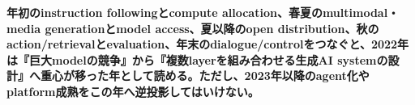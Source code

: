 \noindent\textbf{年初のinstruction followingとcompute allocation、春夏のmultimodal・media generationとmodel access、夏以降のopen distribution、秋のaction/retrievalとevaluation、年末のdialogue/controlをつなぐと、2022年は『巨大modelの競争』から『複数layerを組み合わせる生成AI systemの設計』へ重心が移った年として読める。ただし、2023年以降のagent化やplatform成熟をこの年へ逆投影してはいけない。}\autocite{src-16a1a1dc486e,src-1e362767e63c,src-26aadbc0393f,src-27297a80fac0,src-2832ee43ab8f,src-2c38d2f354fa,src-6ffa5c4e64ca,src-811e1008822e,src-86ce6205a4ed,src-87477ad8b476,src-929080260e16,src-bc1a61aec959,src-e58f1e9c8754,src-e8da8e8f02bc}
